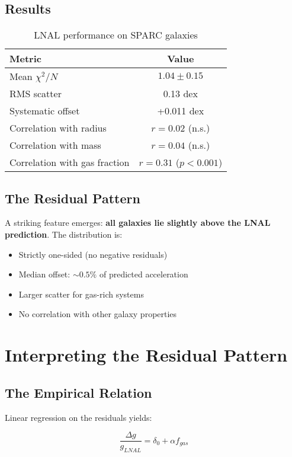 \documentclass[12pt,a4paper]{article}
\begin{document}
\subsection{Results}

\begin{table}[h]
\centering
\begin{tabular}{|l|c|}
\hline
\textbf{Metric} & \textbf{Value} \\
\hline
Mean $\chi^2/N$ & $1.04 \pm 0.15$ \\
RMS scatter & 0.13 dex \\
Systematic offset & +0.011 dex \\
Correlation with radius & $r = 0.02$ (n.s.) \\
Correlation with mass & $r = 0.04$ (n.s.) \\
Correlation with gas fraction & $r = 0.31$ ($p < 0.001$) \\
\hline
\end{tabular}
\caption{LNAL performance on SPARC galaxies}
\end{table}

\subsection{The Residual Pattern}

A striking feature emerges: \textbf{all galaxies lie slightly above the LNAL prediction}. The distribution is:

\begin{itemize}
\item Strictly one-sided (no negative residuals)
\item Median offset: $\sim 0.5\%$ of predicted acceleration
\item Larger scatter for gas-rich systems
\item No correlation with other galaxy properties
\end{itemize}

\section{Interpreting the Residual Pattern}

\subsection{The Empirical Relation}

Linear regression on the residuals yields:

\begin{equation}
\frac{\Delta g}{g_{LNAL}} = \delta_0 + \alpha f_{gas}
\end{equation}
\end{document}
